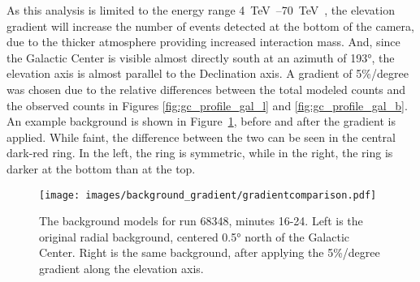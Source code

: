   As this analysis is limited to the energy range \SIrange{4}{70}{\TeV{}}, the elevation gradient will increase the number of events detected at the bottom of the camera, due to the thicker atmosphere providing increased interaction mass.
  And, since the Galactic Center is visible almost directly south at an azimuth of \ang{193}, the elevation axis is almost parallel to the Declination axis.
  A gradient of 5\%/degree was chosen due to the relative differences between the total modeled counts and the observed counts in Figures \ref{fig:gc_profile_gal_l} and \ref{fig:gc_profile_gal_b}.
  An example background is shown in Figure~\ref{fig:bkg_flatvsgrad}, before and after the gradient is applied.
  While faint, the difference between the two can be seen in the central dark-red ring.
  In the left, the ring is symmetric, while in the right, the ring is darker at the bottom than at the top.
  
  \begin{figure}[ht]
    \centering
    \texttt{[image: images/background\_gradient/gradientcomparison.pdf]}
    \caption[Background Gradient Comparison]{
      The background models for run 68348, minutes 16-24.
      Left is the original radial background, centered \ang{0.5} north of the Galactic Center.
      Right is the same background, after applying the 5\%/degree gradient along the elevation axis.
    }
    \label{fig:bkg_flatvsgrad}
  \end{figure}
  
